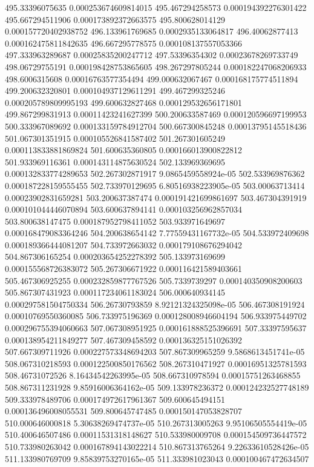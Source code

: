 {495.33396075635 0.000253674609814015
495.467294258573 0.000194392276301422
495.667294511906 0.000173892372663575
495.800628014129 0.000157720402938752
496.133961769685 0.0002935133064817
496.40062877413 0.000162475811842635
496.667295778575 0.000108137557053366
497.333963289687 0.00025835200247712
497.53396354302 0.00023678269733749
498.06729755191 0.000198428753865605
498.267297805244 0.000182247068206933
498.6006315608 0.00016763577354494
499.000632067467 0.000168175774511894
499.200632320801 0.000104937129611291
499.467299325246 0.000205789809995193
499.600632827468 0.000129532656171801
499.867299831913 0.00011423241627399
500.200633587469 0.000120596697199953
500.333967089692 0.000133159784912704
500.667300845248 0.00013795145518436
501.067301351915 0.000105526841587402
501.267301605249 0.000113833881869824
501.600635360805 0.000166013900822812
501.933969116361 0.000143114875630524
502.133969369695 0.000132833774289653
502.267302871917 9.0865459558924e-05
502.533969876362 0.000187228159555455
502.733970129695 6.80516938223905e-05
503.00063713414 0.00023902831659281
503.200637387474 0.000191421699861697
503.467304391919 0.000101044446070894
503.600637894141 0.000103256962857034
503.800638147475 0.000187952798411052
503.933971649697 0.000168479083364246
504.200638654142 7.77559431167732e-05
504.533972409698 0.000189366444081207
504.733972663032 0.000179108676294042
504.867306165254 0.000203654252278392
505.133973169699 0.000155568726383072
505.267306671922 0.000116421589403661
505.467306925255 0.000232859877767526
505.7339739297 0.000140350908200603
505.867307431923 0.000117234061183024
506.000640934145 0.000297581504750334
506.26730793859 8.92121324325098e-05
506.467308191924 0.00010769550360085
506.733975196369 0.000128008946604194
506.933975449702 0.000296755394060663
507.067308951925 0.000161888525396691
507.33397595637 0.000138954211849277
507.467309458592 0.000136325151026392
507.667309711926 0.000227573348694203
507.867309965259 9.5868613451741e-05
508.067310218593 0.000122500850176562
508.267310471927 0.00016951325781593
508.46731072526 8.16434542263995e-05
508.667310978594 0.00015751263468855
508.867311231928 9.85916006364162e-05
509.133978236372 0.000124232527748189
509.333978489706 0.000174972617961367
509.600645494151 0.000136496008055531
509.800645747485 0.000150147053828707
510.000646000818 5.30638269474737e-05
510.267313005263 9.95106505554419e-05
510.400646507486 0.00011531318148627
510.533980009708 0.000154509736447572
510.733980263042 0.000167894143022214
510.867313765264 9.22633610528426e-05
511.133980769709 9.85839753270165e-05
511.333981023043 0.000100467472634507
}
